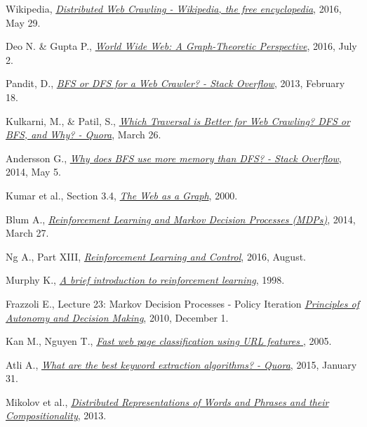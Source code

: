 \documentclass{article}
\begin{document}
\begin{thebibliography}{20}
  Wikipedia,
  \emph{\href{https://en.wikipedia.org/wiki/Distributed_web_crawling}{Distributed Web Crawling - Wikipedia, the free encyclopedia}},
  2016, May 29.

  Deo N. \& Gupta P.,
  \emph{\href{http://wortschatz.uni-leipzig.de/~fwitschel/vorlP2P/literatur/Gupta.pdf}{World Wide Web: A Graph-Theoretic Perspective}},
  2016, July 2.

  Pandit, D.,
  \emph{\href{http://stackoverflow.com/questions/11775256/bfs-or-dfs-for-a-web-crawler}{BFS or DFS for a Web Crawler? - Stack Overflow}},
  2013, February 18.

  Kulkarni, M., \& Patil, S.,
  \emph{\href{https://www.quora.com/Which-traversal-is-better-for-Web-Crawling-DFS-or-BFS-and-Why}{Which Traversal is Better for Web Crawling? DFS or BFS, and Why? - Quora}},
  March 26.

  Andersson G.,
  \emph{\href{http://stackoverflow.com/questions/23477856/why-does-a-breadth-first-search-use-more-memory-than-depth-first}{Why does BFS use more memory than DFS? - Stack Overflow}},
  2014, May 5.
  
  Kumar et al.,
  Section 3.4,
  \emph{\href{http://cs.brown.edu/research/webagent/pods-2000.pdf}{The Web as a Graph}},
  2000.  

  Blum A.,
  \emph{\href{https://www.cs.cmu.edu/~avrim/ML14/lect0326.pdf}{Reinforcement Learning and Markov Decision Processes (MDPs)}},
  2014, March 27.

  Ng A.,
  Part XIII,
  \emph{\href{http://cs229.stanford.edu/notes/cs229-notes12.pdf}{Reinforcement Learning and Control}},
  2016, August.

  Murphy K.,
  \emph{\href{http://www.cs.ubc.ca/~murphyk/Bayes/pomdp.html}{A brief introduction to reinforcement learning}},
  1998.

	Frazzoli E.,
	Lecture 23: Markov Decision Processes - Policy Iteration
	\emph{\href{https://ocw.mit.edu/courses/aeronautics-and-astronautics/16-410-principles-of-autonomy-and-decision-making-fall-2010/lecture-notes/MIT16_410F10_lec23.pdf}{Principles of Autonomy and Decision Making}},
	2010, December 1.

  Kan M., Nguyen T.,
  \emph{\href{https://www.comp.nus.edu.sg/~kanmy/papers/nustrc8_05.pdf}{Fast web page classification using URL features }},
  2005.

	Atli A.,
	\emph{\href{https://www.quora.com/What-are-the-best-keyword-extraction-algorithms-for-natural-language-processing-and-how-can-they-be-implemented-in-Python}{What are the best keyword extraction algorithms? - Quora}},
	2015, January 31.

	Mikolov et al.,
	\emph{\href{http://papers.nips.cc/paper/5021-distributed-representations-of-words-and-phrases-and-their-compositionality.pdf}{Distributed Representations of Words and Phrases and their Compositionality}},
	2013.
\end{thebibliography}
\end{document}
